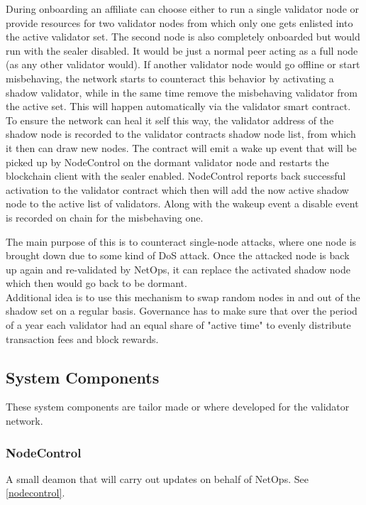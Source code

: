 During onboarding an affiliate can choose either to run a single validator node or provide resources for two validator nodes from which only one gets enlisted into the active validator set.
The second node is also completely onboarded but would run with the sealer disabled. 
It would be just a normal peer acting as a full node (as any other validator would).
If another validator node would go offline or start misbehaving, the network starts to counteract this behavior by activating a shadow validator, while in the same time remove the misbehaving validator from the active set. This will happen automatically via the validator smart contract. To ensure the network can heal it self this way, the validator address of the shadow node is recorded to the validator contracts shadow node list, from which it then can draw new nodes. The contract will emit a wake up event that will be picked up by NodeControl on the dormant validator node and restarts the blockchain client with the sealer enabled. NodeControl reports back successful activation to the validator contract which then will add the now active shadow node to the active list of validators. Along with the wakeup event a disable event is recorded on chain for the misbehaving one.

The main purpose of this is to counteract single-node attacks, where one node is brought down due to some kind of DoS attack. 
Once the attacked node is back up again and re-validated by NetOps, it can replace the activated shadow node  which then would go back to be dormant. \\

Additional idea is to use this mechanism to swap random nodes in and out of the shadow set on a regular basis. Governance has to make sure that over the period of a year each validator had an equal share of "active time" to evenly distribute transaction fees and block rewards.


\subsection{System Components}
\label{components}

These system components are tailor made or where developed for the validator network.

\subsubsection{NodeControl}

A small deamon that will carry out updates on behalf of NetOps. See \ref{nodecontrol}.

